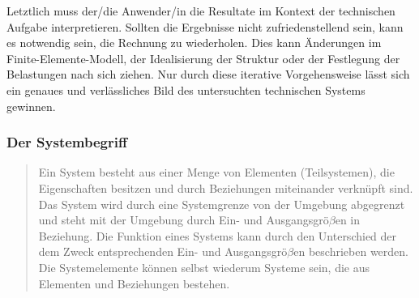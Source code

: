 Letztlich muss der/die Anwender/in die Resultate im Kontext der technischen Aufgabe interpretieren. Sollten die Ergebnisse nicht zufriedenstellend sein, kann es notwendig sein, die Rechnung zu wiederholen. Dies kann Änderungen im Finite-Elemente-Modell, der Idealisierung der Struktur oder der Festlegung der Belastungen nach sich ziehen. Nur durch diese iterative Vorgehensweise lässt sich ein genaues und verlässliches Bild des untersuchten technischen Systems gewinnen.


% 
% 
% 
% 
% 

\subsubsection{Der Systembegriff}

\begin{quote}
Ein System besteht aus einer Menge von Elementen (Teilsystemen), die Eigenschaften besitzen und durch Beziehungen miteinander verknüpft sind. Das System wird durch eine Systemgrenze von der Umgebung abgegrenzt und steht mit der Umgebung durch Ein- und Ausgangsgrö$\beta$en in Beziehung. Die Funktion eines Systems kann durch den Unterschied der dem Zweck entsprechenden Ein- und Ausgangsgrö$\beta$en beschrieben werden. Die Systemelemente können selbst wiederum Systeme sein, die aus Elementen und Beziehungen bestehen. \cite{ehrlenspiel2013integrierte}
\end{quote}

